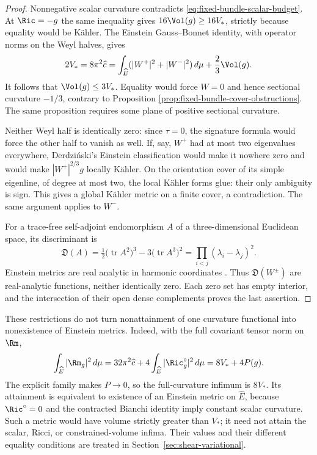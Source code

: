 \begin{proof}
Nonnegative scalar curvature contradicts
\eqref{eq:fixed-bundle-scalar-budget}.  At $\Ric=-g$ the same
inequality gives $16\Vol(g)\ge16V_*$, strictly because equality
would be K\"ahler.  The Einstein Gauss--Bonnet identity, with
operator norms on the Weyl halves, gives
\begin{equation}\label{eq:fixed-bundle-einstein-cgb}
 2V_*=8\pi^2\widehat c
   =\int_{\widehat E}(|W^+|^2+|W^-|^2)\,d\mu
      +\frac23\Vol(g).
\end{equation}
It follows that $\Vol(g)\le3V_*$.  Equality would force $W=0$
and hence sectional curvature $-1/3$, contrary to Proposition
\ref{prop:fixed-bundle-cover-obstructions}.  The same proposition
requires some plane of positive sectional curvature.

Neither Weyl half is identically zero: since $\tau=0$, the
signature formula would force the other half to vanish as well.
If, say, $W^+$ had at most two eigenvalues everywhere,
Derdzi\'nski's Einstein classification
\cite[Proposition 5(i),(iv)]{Derdzinski1983} would make it nowhere
zero and would make $|W^+|^{2/3}g$ locally K\"ahler.  On the
orientation cover of its simple eigenline, of degree at most two,
the local K\"ahler forms glue: their only ambiguity is sign.
This gives a global K\"ahler metric on a finite cover, a
contradiction.  The same argument applies to $W^-$.

For a trace-free self-adjoint endomorphism $A$ of a three-dimensional
Euclidean space, its discriminant is
\[
 \mathfrak D(A)=\tfrac12\bigl(\operatorname{tr}A^2\bigr)^3
                  -3\bigl(\operatorname{tr}A^3\bigr)^2
              =\prod_{i<j}(\lambda_i-\lambda_j)^2.
\]
Einstein metrics are real analytic in harmonic coordinates
\cite[Theorem 5.2]{DeTurckKazdan}.  Thus
$\mathfrak D(W^\pm)$ are real-analytic functions, neither identically
zero.  Each zero set has empty interior, and the intersection of
their open dense complements proves the last assertion.
\end{proof}

These restrictions do not turn nonattainment of one curvature
functional into nonexistence of Einstein metrics.  Indeed, with
the full covariant tensor norm on $\Rm$,
\begin{equation}\label{eq:fixed-bundle-full-energy}
 \int_{\widehat E}|\Rm_g|^2\,d\mu
       =32\pi^2\widehat c+4\int_{\widehat E}|\Ric_g^\circ|^2\,d\mu
       =8V_*+4P(g).
\end{equation}
The explicit family makes $P\to0$, so the full-curvature infimum
is $8V_*$.  Its attainment is equivalent to existence of an Einstein
metric on $\widehat E$, because $\Ric^\circ=0$ and the contracted
Bianchi identity imply constant scalar curvature.  Such a metric
would have volume strictly greater than $V_*$; it need not attain
the scalar, Ricci, or constrained-volume infima.  Their values and
their different equality conditions are treated in
Section~\ref{sec:shear-variational}.

